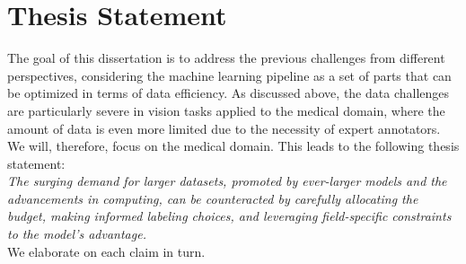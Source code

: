 \section{Thesis Statement}
The goal of this dissertation is to address the previous challenges from different perspectives, considering the machine learning pipeline as a set of parts that can be optimized in terms of data efficiency. As discussed above, the data challenges are particularly severe in vision tasks applied to the medical domain, where the amount of data is even more limited due to the necessity of expert annotators. We will, therefore, focus on the medical domain. This leads to the following thesis statement:
\\%

\textit{The surging demand for larger datasets, promoted by ever-larger models and the advancements in computing, can be counteracted by carefully allocating the budget, making informed labeling choices, and leveraging field-specific constraints to the model's advantage.}
\\

We elaborate on each claim in turn.